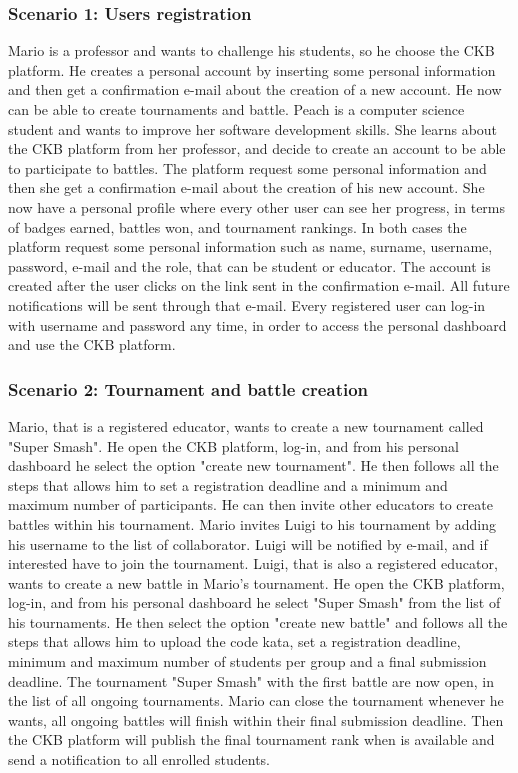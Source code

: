 \subsubsection{Scenario 1: Users registration}
Mario is a professor and wants to challenge his students, so he choose the CKB platform. He creates a personal account by inserting some personal information and then get a confirmation e-mail about the creation of a new account. He now can be able to create tournaments and battle. \newline
Peach is a computer science student and wants to improve her software development skills. She learns about the CKB platform from her professor, and decide to create an account to be able to participate to battles. The platform request some personal information and then she get a confirmation e-mail about the creation of his new account. She now have a personal profile where every other user can see her progress, in terms of badges earned, battles won, and tournament rankings. \newline
In both cases the platform request some personal information such as name, surname, username, password, e-mail and the role, that can be student or educator. The account is created after the user clicks on the link sent in the confirmation e-mail. All future notifications will be sent through that e-mail. \newline
Every registered user can log-in with username and password any time, in order to access the personal dashboard and use the CKB platform.

\subsubsection{Scenario 2: Tournament and battle creation}
Mario, that is a registered educator, wants to create a new tournament called "Super Smash". He open the CKB platform, log-in, and from his personal dashboard he select the option "create new tournament". He then follows all the steps that allows him to set a registration deadline and a minimum and maximum number of participants. He can then invite other educators to create battles within his tournament. \newline
Mario invites Luigi to his tournament by adding his username to the list of collaborator. Luigi will be notified by e-mail, and if interested have to join the tournament. \newline
Luigi, that is also a registered educator, wants to create a new battle in Mario's tournament. He open the CKB platform, log-in, and from his personal dashboard he select "Super Smash" from the list of his tournaments.
He then select the option "create new battle" and follows all the steps that allows him to upload the code kata, set a registration deadline, minimum and maximum number of students per group and a final submission deadline.
The tournament "Super Smash" with the first battle are now open, in the list of all ongoing tournaments. \newline
Mario can close the tournament whenever he wants, all ongoing battles will finish within their final submission deadline. Then the CKB platform will publish the final tournament rank when is available and send a notification to all enrolled students.

